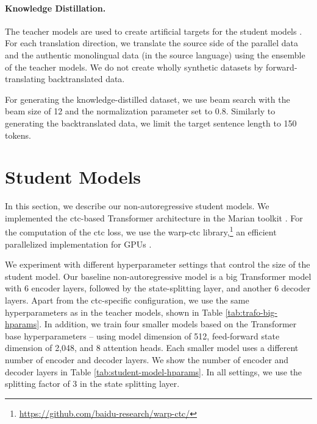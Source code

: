 \paragraph{Knowledge Distillation.} The teacher models are used to create
artificial targets for the student models \citep{kim-rush-2016-sequence}. For
each translation direction, we translate the source side of the parallel data
and the authentic monolingual data (in the source language) using the ensemble
of the teacher models. We do not create wholly synthetic datasets by
forward-translating backtranslated data.

For generating the knowledge-distilled dataset, we use beam search with the
beam size of 12 and the normalization parameter set to 0.8. Similarly to
generating the backtranslated data, we limit the target sentence length to 150
tokens.


\section{Student Models}%
\label{sec:exp:students}

In this section, we describe our non-autoregressive student models. We
implemented the \acs{ctc}-based Transformer architecture in the Marian toolkit
\citep{junczys-dowmunt-etal-2018-marian}. For the computation of the \ac{ctc}
loss, we use the warp-ctc
library,\footnote{\url{https://github.com/baidu-research/warp-ctc/}} an
efficient parallelized implementation for GPUs \citep{amodei-etal-2016-deep}.

We experiment with different hyperparameter settings that control the size of
the student model. Our baseline non-autoregressive model is a big Transformer
model with 6 encoder layers, followed by the state-splitting layer, and another
6 decoder layers. Apart from the \ac{ctc}-specific configuration, we use the
same hyperparameters as in the teacher models, shown in Table
\ref{tab:trafo-big-hparams}. In addition, we train four smaller models based on
the Transformer base hyperparameters -- using model dimension of 512,
feed-forward state dimension of 2,048, and 8 attention heads. Each smaller
model uses a different number of encoder and decoder layers. We show the number
of encoder and decoder layers in Table \ref{tab:student-model-hparams}. In all
settings, we use the splitting factor of 3 in the state splitting layer.

